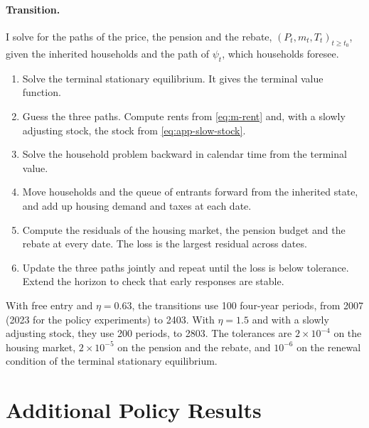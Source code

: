 \paragraph{Transition.} I solve for the paths of the price, the pension and
the rebate, $(P_t,m_t,T_t)_{t\geq t_0}$, given the inherited households and
the path of $\psi_t$, which households foresee.
\begin{enumerate}
\item Solve the terminal stationary equilibrium. It gives the terminal value
function.
\item Guess the three paths. Compute rents from \eqref{eq:m-rent} and, with a
slowly adjusting stock, the stock from \eqref{eq:app-slow-stock}.
\item Solve the household problem backward in calendar time from the terminal
value.
\item Move households and the queue of entrants forward from the inherited
state, and add up housing demand and taxes at each date.
\item Compute the residuals of the housing market, the pension budget and the
rebate at every date. The loss is the largest residual across dates.
\item Update the three paths jointly and repeat until the loss is below
tolerance. Extend the horizon to check that early responses are stable.
\end{enumerate}
With free entry and $\eta=0.63$, the transitions use 100 four-year periods,
from 2007 (2023 for the policy experiments) to 2403. With $\eta=1.5$ and with
a slowly adjusting stock, they use 200 periods, to 2803. The tolerances are
$2\times10^{-4}$ on the housing market, $2\times10^{-5}$ on the pension and
the rebate, and $10^{-6}$ on the renewal condition of the terminal stationary
equilibrium.





\section{Additional Policy Results}
\label{app:policy-more}


